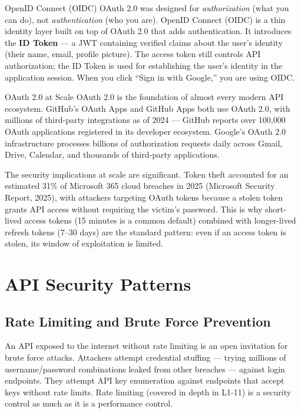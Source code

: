 \documentclass[11pt,a4paper]{article}
\begin{document}
\begin{termbox}{OpenID Connect (OIDC)}
OAuth 2.0 was designed for \textit{authorization} (what you can do), not \textit{authentication} (who you are). OpenID Connect (OIDC) is a thin identity layer built on top of OAuth 2.0 that adds authentication. It introduces the \textbf{ID Token} --- a JWT containing verified claims about the user's identity (their name, email, profile picture). The access token still controls API authorization; the ID Token is used for establishing the user's identity in the application session. When you click ``Sign in with Google,'' you are using OIDC.
\end{termbox}

\begin{industrybox}{OAuth 2.0 at Scale}
OAuth 2.0 is the foundation of almost every modern API ecosystem. GitHub's OAuth Apps and GitHub Apps both use OAuth 2.0, with millions of third-party integrations as of 2024 --- GitHub reports over 100,000 OAuth applications registered in its developer ecosystem. Google's OAuth 2.0 infrastructure processes billions of authorization requests daily across Gmail, Drive, Calendar, and thousands of third-party applications.

The security implications at scale are significant. Token theft accounted for an estimated 31\% of Microsoft 365 cloud breaches in 2025 (Microsoft Security Report, 2025), with attackers targeting OAuth tokens because a stolen token grants API access without requiring the victim's password. This is why short-lived access tokens (15 minutes is a common default) combined with longer-lived refresh tokens (7--30 days) are the standard pattern: even if an access token is stolen, its window of exploitation is limited.
\end{industrybox}

\section{API Security Patterns}

\subsection{Rate Limiting and Brute Force Prevention}

An API exposed to the internet without rate limiting is an open invitation for brute force attacks. Attackers attempt credential stuffing --- trying millions of username/password combinations leaked from other breaches --- against login endpoints. They attempt API key enumeration against endpoints that accept keys without rate limits. Rate limiting (covered in depth in L1-11) is a security control as much as it is a performance control.
\end{document}
